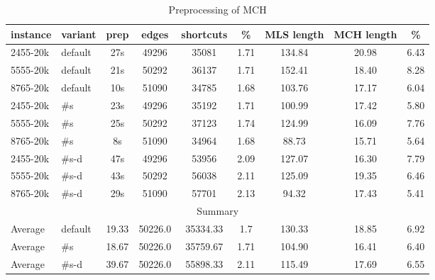 %
\begin{table}[h]
\tiny
\caption{Preprocessing of MCH}
\label{result2}
\begin{tabular}{l|l|c|ccc|ccc}
    instance & variant & prep & edges & shortcuts & \% & MLS length & MCH length & \% \\ \hline
2455-20k & default & 27s & 49296 & 35081 & 1.71 & 134.84 & 20.98 & 6.43 \\ \hline
5555-20k & default & 21s & 50292 & 36137 & 1.71 & 152.41 & 18.40 & 8.28 \\ \hline 
8765-20k & default & 10s & 51090 & 34785 & 1.68 & 103.76 & 17.17 & 6.04 \\ \hline
2455-20k & \#s & 23s & 49296 & 35192 & 1.71 & 100.99 & 17.42 & 5.80 \\ \hline
5555-20k & \#s & 25s & 50292 & 37123 & 1.74 & 124.99 & 16.09 & 7.76 \\ \hline
8765-20k & \#s & 8s & 51090 & 34964 & 1.68 & 88.73 & 15.71 & 5.64 \\ \hline
2455-20k & \#s-d & 47s & 49296 & 53956 & 2.09 & 127.07 & 16.30 & 7.79 \\ \hline
5555-20k & \#s-d & 43s & 50292 & 56038 & 2.11 & 125.09 & 19.35 & 6.46 \\ \hline
8765-20k & \#s-d & 29s & 51090 & 57701 & 2.13 & 94.32 & 17.43 & 5.41 \\ \hline
\multicolumn{9}{c}{Summary} \\ \hline
Average & default & 19.33 & 50226.0 & 35334.33 & 1.7 & 130.33 & 18.85 & 6.92 \\ \hline
Average & \#s & 18.67 & 50226.0 & 35759.67 & 1.71 & 104.90 & 16.41 & 6.40 \\ \hline
Average & \#s-d & 39.67 & 50226.0 & 55898.33 & 2.11 & 115.49 & 17.69 & 6.55 \\ \hline
\end{tabular}
\end{table}


